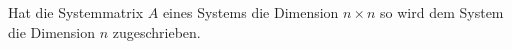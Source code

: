 Hat die Systemmatrix $A$ eines Systems die Dimension $n \times n$ so wird dem System die Dimension $n$ zugeschrieben.
